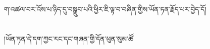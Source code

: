 ག་འཚལ་བར་འོས་པ་ཉིད་དུ་བསྒྲུབ་པའི་ཕྱིར་ཇི་ལྟ་བ་བཞིན་གྱིས་ཡོན་ཏན་རྗོད་པར་བྱེད་དོ།\chapter{ }།ཡོན་ཏན་དེ་དག་ཀྱང་རང་དང་གཞན་གྱི་དོན་ཕུན་སུམ་ཚོ